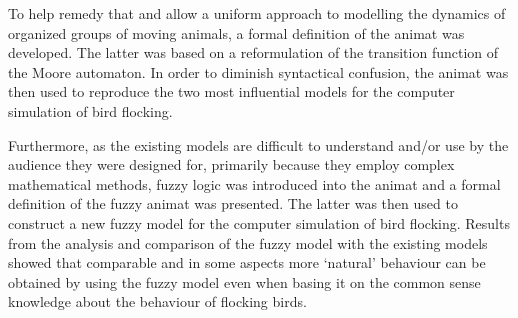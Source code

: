 \begin{Abstract}
To help remedy that and allow a uniform approach to modelling the dynamics of organized groups of moving animals, a formal definition of the animat was developed. The latter was based on a reformulation of the transition function of the Moore automaton. In order to diminish syntactical confusion, the animat was then used to reproduce the two most influential models for the computer simulation of bird flocking.

Furthermore, as the existing models are difficult to understand and/or use by the audience they were designed for, primarily because they employ complex mathematical methods, fuzzy logic was introduced into the animat and a formal definition of the fuzzy animat was presented. The latter was then used to construct a new fuzzy model for the computer simulation of bird flocking. Results from the analysis and comparison of the fuzzy model with the existing models showed that comparable and in some aspects more `natural' behaviour can be obtained by using the fuzzy model even when basing it on the common sense knowledge about the behaviour of flocking birds.
\end{Abstract}
